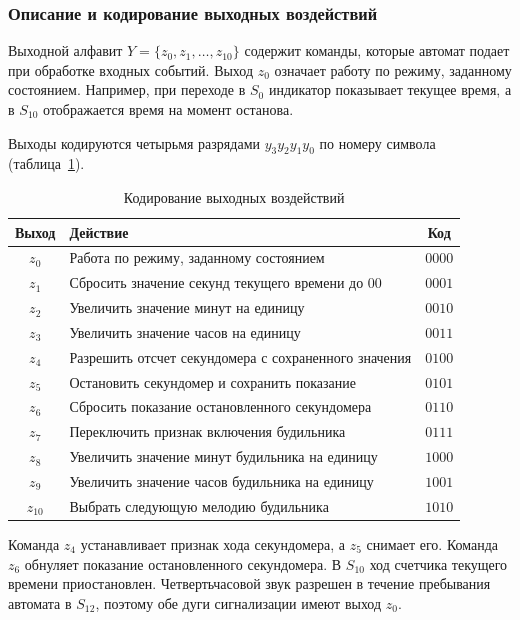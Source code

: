 \newpage
\subsubsection{Описание и кодирование выходных воздействий}
\label{sec:outputs}

Выходной алфавит $Y = \{z_0,z_1,\ldots,z_{10}\}$ содержит команды, которые автомат подает при обработке входных событий. Выход $z_0$ означает работу по режиму, заданному состоянием. Например, при переходе в $S_0$ индикатор показывает текущее время, а в $S_{10}$ отображается время на момент останова.

Выходы кодируются четырьмя разрядами $y_3y_2y_1y_0$ по номеру символа (таблица~\ref{tab:outputs}).

\begin{table}[H]
	\centering
	\caption{Кодирование выходных воздействий}
	\label{tab:outputs}
	\small{}
	\renewcommand{\arraystretch}{1.10}
	\begin{tabularx}{\textwidth}{|c|>{\raggedright\arraybackslash}X|c|}
		\hline
		Выход & Действие & Код \\
		\hline
		$z_0$ & Работа по режиму, заданному состоянием & $0000$ \\
		$z_1$ & Сбросить значение секунд текущего времени до $00$ & $0001$ \\
		$z_2$ & Увеличить значение минут на единицу & $0010$ \\
		$z_3$ & Увеличить значение часов на единицу & $0011$ \\
		$z_4$ & Разрешить отсчет секундомера с сохраненного значения & $0100$ \\
		$z_5$ & Остановить секундомер и сохранить показание & $0101$ \\
		$z_6$ & Сбросить показание остановленного секундомера & $0110$ \\
		$z_7$ & Переключить признак включения будильника & $0111$ \\
		$z_8$ & Увеличить значение минут будильника на единицу & $1000$ \\
		$z_9$ & Увеличить значение часов будильника на единицу & $1001$ \\
		$z_{10}$ & Выбрать следующую мелодию будильника & $1010$ \\
		\hline
	\end{tabularx}
\end{table}

Команда $z_4$ устанавливает признак хода секундомера, а $z_5$ снимает его. Команда $z_6$ обнуляет показание остановленного секундомера. В $S_{10}$ ход счетчика текущего времени приостановлен. Четвертьчасовой звук разрешен в течение пребывания автомата в $S_{12}$, поэтому обе дуги сигнализации имеют выход $z_0$.
